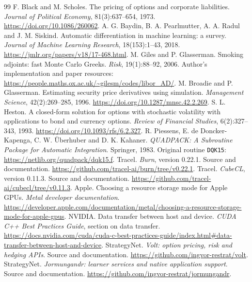 \documentclass[8pt]{strategynet-journal}
\begin{document}
\begin{SNcolumns}
\begin{thebibliography}{99}
 F. Black and M. Scholes.
The pricing of options and corporate liabilities.
\emph{Journal of Political Economy}, 81(3):637--654, 1973.
\url{https://doi.org/10.1086/260062}.
 A. G. Baydin, B. A. Pearlmutter, A. A. Radul and J. M. Siskind.
Automatic differentiation in machine learning: a survey.
\emph{Journal of Machine Learning Research}, 18(153):1--43, 2018.
\url{https://jmlr.org/papers/v18/17-468.html}.
 M. Giles and P. Glasserman.
Smoking adjoints: fast Monte Carlo Greeks.
\emph{Risk}, 19(1):88--92, 2006.
Author's implementation and paper resources:
\url{https://people.maths.ox.ac.uk/~gilesm/codes/libor_AD/}.
 M. Broadie and P. Glasserman.
Estimating security price derivatives using simulation.
\emph{Management Science}, 42(2):269--285, 1996.
\url{https://doi.org/10.1287/mnsc.42.2.269}.
 S. L. Heston.
A closed-form solution for options with stochastic volatility with applications
to bond and currency options.
\emph{Review of Financial Studies}, 6(2):327--343, 1993.
\url{https://doi.org/10.1093/rfs/6.2.327}.
 R. Piessens, E. de Doncker-Kapenga, C. W. \"Uberhuber and
D. K. Kahaner. \emph{QUADPACK: A Subroutine Package for Automatic Integration}.
Springer, 1983. Original routine \texttt{DQK15}:
\url{https://netlib.org/quadpack/dqk15.f}.
 Tracel. \emph{Burn}, version 0.22.1. Source and documentation.
\url{https://github.com/tracel-ai/burn/tree/v0.22.1}.
 Tracel. \emph{CubeCL}, version 0.11.3. Source and documentation.
\url{https://github.com/tracel-ai/cubecl/tree/v0.11.3}.
 Apple. Choosing a resource storage mode for Apple GPUs.
\emph{Metal developer documentation}.
\url{https://developer.apple.com/documentation/metal/choosing-a-resource-storage-mode-for-apple-gpus}.
 NVIDIA. Data transfer between host and device.
\emph{CUDA C++ Best Practices Guide}, section on data transfer.
\url{https://docs.nvidia.com/cuda/cuda-c-best-practices-guide/index.html#data-transfer-between-host-and-device}.
 StrategyNet. \emph{Volt: option pricing, risk and hedging APIs}.
Source and documentation.
\url{https://github.com/ingvor-restrat/volt}.
 StrategyNet. \emph{Jormungandr: learner services and native application support}. Source and documentation.
\url{https://github.com/ingvor-restrat/jormungandr}.
\end{thebibliography}
\end{SNcolumns}
\end{document}
